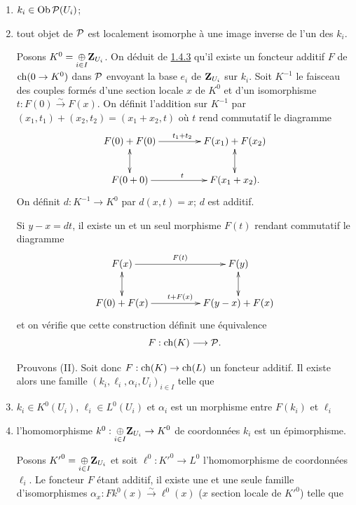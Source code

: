 \documentclass[10pt]{../fichiers-configuration-latex/smfart}
\begin{document}
\begin{enumerate}
\renewcommand{\theenumi}{\alph{enumi}}
\renewcommand{\labelenumi}{(\theenumi)}
\item $k_{i}\in \operatorname{Ob} {\mathcal P}(U_{i})$;

\item tout objet de ${\mathcal P}$ est localement isomorphe à une image
inverse de l'un des $k_{i}$.

Posons $K^{0}=\displaystyle{\mathop{\oplus}_{i\in
I}}\mathbf{Z}_{U_{i}}$. On déduit de \hyperref[XVIII.lem1.4.3]{1.4.3} qu'il existe un foncteur
additif $F$ de $\operatorname{ch}(0\rightarrow K^{0})$ dans ${\mathcal P}$ envoyant
la base $e_{i}$ de $\mathbf{Z}_{U_{i}}$ sur $k_{i}$. Soit $K^{-1}$ le
faisceau des couples formés d'une section locale $x$ de $K^{0}$ et
d'un isomorphisme $t:F(0)\xrightarrow{\sim} F(x)$. On définit
l'addition sur $K^{-1}$ par $(x_{1},
t_{1})+(x_{2},t_{2})=(x_{1}+x_{2},t)$ où $t$ rend commutatif le
diagramme
$$
\xymatrix@C=1.5cm{
F(0) + F(0)    \ar[r]^{t_1+t_2} \ar@{<->}[d]   & F(x_1) + F(x_2)\ar@{<->}[d]\\
F(0+0)          \ar[r]^{t}         & F(x_1+x_2).
}
$$
On définit $d:K^{-1}\rightarrow K^{0}$ par $d(x,t)=x$; $d$ est
additif.

Si $y-x=dt$, il existe un et un seul morphisme $F(t)$ rendant
commutatif le diagramme
$$
\xymatrix@C=1.75cm{
F(x)           \ar[r]^{F(t)}   \ar@{<->}[d]& F(y) \ar@{<->}[d]\\
F(0)+F(x)      \ar[r]^{t+F(x)} & F(y-x)+F(x)
}
$$
et on vérifie que cette construction définit une équivalence
$$
F:\operatorname{ch}(K)\longrightarrow {\mathcal P}{}.
$$

Prouvons (II). Soit donc $F:\operatorname{ch}(K)\rightarrow \operatorname{ch}(L)$ un foncteur
additif. Il existe alors une famille $(k_{i},\ell_{i}, \alpha_{i},
U_{i})_{i\in I}$ telle que

\item $k_{i}\in K^{0}(U_{i})$, $\ell_{i}\in L^{0}(U_{i})$ et
$\alpha_{i}$ est un morphisme entre $F(k_{i})$ et $\ell_{i}$

\item l'homomorphisme $k^{0}:\displaystyle{\mathop{\oplus}_{i\in
I}}\mathbf{Z}_{U_{i}}\rightarrow K^{0}$ de coordonnées $k_{i}$ est un
épimorphisme.

Posons ${K'}^{0}=\displaystyle{\mathop{\oplus}_{i\in
I}}\mathbf{Z}_{U_{i}}$ et soit $\ell^{0}:{K'}^{0}\rightarrow L^{0}$
l'homomorphisme de coordonnées $\ell_{i}$. Le foncteur $F$ étant
additif, il existe une et une seule famille d'isomorphismes
$\alpha_{x}:Fk^{0}(x)\xrightarrow{\sim}\ell^{0}(x)$ ($x$ section
locale de ${K'}^{0}$) telle que


\end{enumerate}
\end{document}
